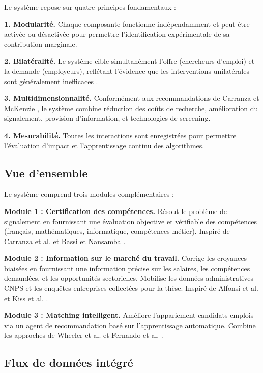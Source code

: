 \documentclass[12pt]{article}
\begin{document}
Le système repose sur quatre principes fondamentaux :

\textbf{1. Modularité.} Chaque composante fonctionne indépendamment et peut être activée ou désactivée pour permettre l'identification expérimentale de sa contribution marginale.

\textbf{2. Bilatéralité.} Le système cible simultanément l'offre (chercheurs d'emploi) et la demande (employeurs), reflétant l'évidence que les interventions unilatérales sont généralement inefficaces \citep{fernando2023}.

\textbf{3. Multidimensionnalité.} Conformément aux recommandations de Carranza et McKenzie \citeyearpar{carranza2024}, le système combine réduction des coûts de recherche, amélioration du signalement, provision d'information, et technologies de screening.

\textbf{4. Mesurabilité.} Toutes les interactions sont enregistrées pour permettre l'évaluation d'impact et l'apprentissage continu des algorithmes.

\subsection{Vue d'ensemble}

Le système comprend trois modules complémentaires :

\textbf{Module 1 : Certification des compétences.} Résout le problème de signalement en fournissant une évaluation objective et vérifiable des compétences (français, mathématiques, informatique, compétences métier). Inspiré de Carranza et al. \citeyearpar{carranza2022} et Bassi et Nansamba \citeyearpar{bassi2022}.

\textbf{Module 2 : Information sur le marché du travail.} Corrige les croyances biaisées en fournissant une information précise sur les salaires, les compétences demandées, et les opportunités sectorielles. Mobilise les données administratives CNPS et les enquêtes entreprises collectées pour la thèse. Inspiré de Alfonsi et al. \citeyearpar{alfonsi2022} et Kiss et al. \citeyearpar{kiss2023}.

\textbf{Module 3 : Matching intelligent.} Améliore l'appariement candidats-emplois via un agent de recommandation basé sur l'apprentissage automatique. Combine les approches de Wheeler et al. \citeyearpar{wheeler2022} et Fernando et al. \citeyearpar{fernando2023}.

\subsection{Flux de données intégré}
\end{document}
